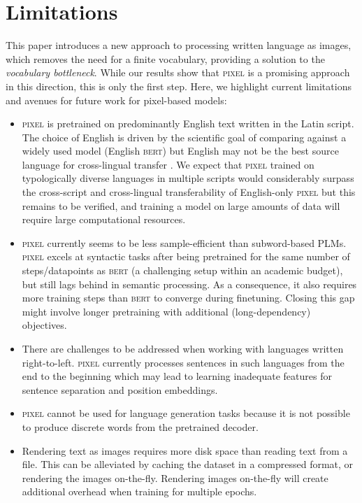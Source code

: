 \documentclass{article}
\newcommand{\model}{\textsc{pixel}\xspace}
\begin{document}
\section{Limitations}
\label{app:limitations}
This paper introduces a new approach to processing written language as images, which removes the need for a finite vocabulary, providing a solution to the \emph{vocabulary bottleneck}. While our results show that \model is a promising approach in this direction, this is only the first step.
Here, we highlight current limitations and avenues for future work for pixel-based models:
\begin{itemize}
\itemsep-0.04em
\item \model is pretrained on predominantly English text written in the Latin script. The choice of English is driven by the scientific goal of comparing against a widely used model (English \textsc{bert}) but English may not be the best source language for cross-lingual transfer \citep{turc2021revisiting,blevins2022analyzing}.
We expect that \model{} trained on typologically diverse languages in multiple scripts would considerably surpass the cross-script and cross-lingual transferability of English-only \model{} but this remains to be verified, and training a model on large amounts of data will require large computational resources. 
\item \model currently seems to be less sample-efficient than subword-based PLMs. \model{} excels at syntactic tasks after being pretrained for the same number of steps/datapoints as \textsc{bert} (a challenging setup within an academic budget), but still lags behind in semantic processing.
As a consequence, it also requires more training steps  than \textsc{bert} to converge during finetuning.
Closing this gap might involve longer pretraining with additional (long-dependency) objectives.
\item There are challenges to be addressed when working with languages written right-to-left. \model{} currently processes sentences in such languages from the end to the beginning which may lead to learning inadequate features for sentence separation and position embeddings.
\item \model cannot be used for language generation tasks because it is not possible to produce discrete words from the pretrained decoder.

\item Rendering text as images requires more disk space than reading text from a file. This can be alleviated by caching the dataset in a compressed format, or rendering the images on-the-fly. Rendering images on-the-fly will create additional overhead when training for multiple epochs.

\end{itemize}
\end{document}
